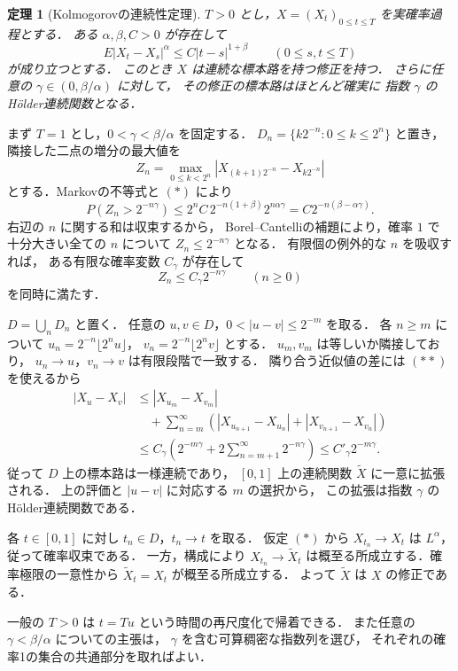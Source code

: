 \documentclass[a5paper,10pt,onecolumn]{jsarticle}
\makeatletter
\theoremstyle{mathnotetheorem}
\newtheorem{theorem}{定理}[section]
\renewcommand{\proofname}{証明}
\renewenvironment{proof}[1][\proofname]{%
  \par\pushQED{\qed}\normalfont\topsep4\p@\@plus2\p@\relax
  \trivlist\item[\hskip\labelsep\bfseries #1]\ignorespaces
}{\popQED\endtrivlist\@endpefalse}
\makeatother
\begin{document}
\begin{theorem}[Kolmogorovの連続性定理]\label{thm:kol-cont}
$T>0$ とし，$X=(X_t)_{0\le t\le T}$ を実確率過程とする．
ある $\alpha,\beta,C>0$ が存在して
\[
 E|X_t-X_s|^\alpha\le C|t-s|^{1+\beta}
 \qquad(0\le s,t\le T)
 \tag{$*$}
\]
が成り立つとする．
このとき $X$ は連続な標本路を持つ修正を持つ．
さらに任意の $\gamma\in(0,\beta/\alpha)$ に対して，
その修正の標本路はほとんど確実に
指数 $\gamma$ のH\"older連続関数となる．
\end{theorem}
\begin{proof}
まず $T=1$ とし，$0<\gamma<\beta/\alpha$ を固定する．
$D_n=\{k2^{-n}:0\le k\le2^n\}$ と置き，
隣接した二点の増分の最大値を
\[
 Z_n=\max_{0\le k<2^n}
 |X_{(k+1)2^{-n}}-X_{k2^{-n}}|
\]
とする．Markovの不等式と $(*)$ により
\[
 P(Z_n>2^{-n\gamma})
 \le 2^n C\,2^{-n(1+\beta)}2^{n\alpha\gamma}
 =C2^{-n(\beta-\alpha\gamma)}.
\]
右辺の $n$ に関する和は収束するから，
Borel--Cantelliの補題により，確率 $1$ で
十分大きい全ての $n$ について
$Z_n\le2^{-n\gamma}$ となる．
有限個の例外的な $n$ を吸収すれば，
ある有限な確率変数 $C_\gamma$ が存在して
\[
 Z_n\le C_\gamma2^{-n\gamma}\qquad(n\ge0)
 \tag{$**$}
\]
を同時に満たす．

$D=\bigcup_nD_n$ と置く．
任意の $u,v\in D$，$0<|u-v|\le2^{-m}$ を取る．
各 $n\ge m$ について
$u_n=2^{-n}\lfloor2^nu\rfloor$，
$v_n=2^{-n}\lfloor2^nv\rfloor$ とする．
$u_m,v_m$ は等しいか隣接しており，
$u_n\to u$，$v_n\to v$ は有限段階で一致する．
隣り合う近似値の差には $(**)$ を使えるから
\begin{align*}
 |X_u-X_v|
 &\le |X_{u_m}-X_{v_m}|\\
 &\quad+\sum_{n=m}^{\infty}
  (|X_{u_{n+1}}-X_{u_n}|
   +|X_{v_{n+1}}-X_{v_n}|)\\
 &\le C_\gamma
 \left(2^{-m\gamma}+2\sum_{n=m+1}^\infty2^{-n\gamma}\right)
 \le C'_\gamma2^{-m\gamma}.
\end{align*}
従って $D$ 上の標本路は一様連続であり，
$[0,1]$ 上の連続関数 $\widetilde X$ に一意に拡張される．
上の評価と $|u-v|$ に対応する $m$ の選択から，
この拡張は指数 $\gamma$ のH\"older連続関数である．

各 $t\in[0,1]$ に対し $t_n\in D$，$t_n\to t$ を取る．
仮定 $(*)$ から $X_{t_n}\to X_t$ は
$L^\alpha$，従って確率収束である．
一方，構成により $X_{t_n}\to\widetilde X_t$
は概至る所成立する．確率極限の一意性から
$\widetilde X_t=X_t$ が概至る所成立する．
よって $\widetilde X$ は $X$ の修正である．

一般の $T>0$ は $t=Tu$ という時間の再尺度化で帰着できる．
また任意の $\gamma<\beta/\alpha$ についての主張は，
$\gamma$ を含む可算稠密な指数列を選び，
それぞれの確率1の集合の共通部分を取ればよい．
\end{proof}
\end{document}
